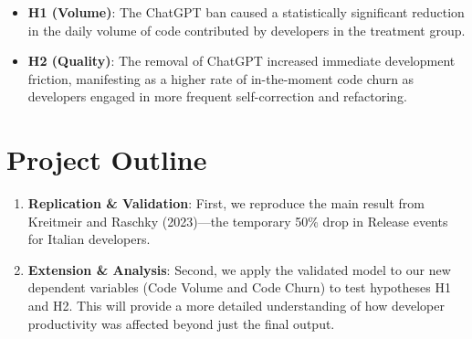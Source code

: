 \begin{itemize}
  \item \textbf{H1 (Volume)}: The ChatGPT ban caused a statistically significant reduction in the daily volume of code contributed by developers in the treatment group.
  \item \textbf{H2 (Quality)}: The removal of ChatGPT increased immediate development friction, manifesting as a higher rate of in-the-moment code churn as developers engaged in more frequent self-correction and refactoring.
\end{itemize}


\section*{Project Outline}

\begin{enumerate}
  \item \textbf{Replication \& Validation}: First, we reproduce the main result from Kreitmeir and Raschky (2023)—the temporary 50\% drop in Release events for Italian developers.
  \item \textbf{Extension \& Analysis}: Second, we apply the validated model to our new dependent variables (Code Volume and Code Churn) to test hypotheses H1 and H2. This will provide a more detailed understanding of how developer productivity was affected beyond just the final output.
\end{enumerate}
